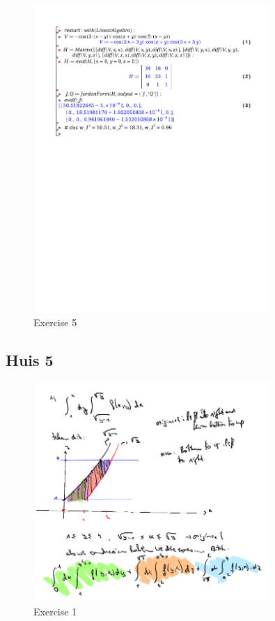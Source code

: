 \documentclass[a4paper]{article}
\begin{document}
\begin{figure}[H]
	\centering
	\includegraphics[width=0.8\textwidth]{exercises/huis_4_ex_5.pdf}
	\caption{Exercise 5}
	\label{fig:huis_4_ex_5}
\end{figure}

\subsection*{Huis 5}


\begin{figure}[H]
	\centering
	\includegraphics[width=0.8\textwidth]{assets/huis_5_ex_1.png}
	\caption{Exercise 1}
	\label{fig:huis_5_ex_1}
\end{figure}
\end{document}
